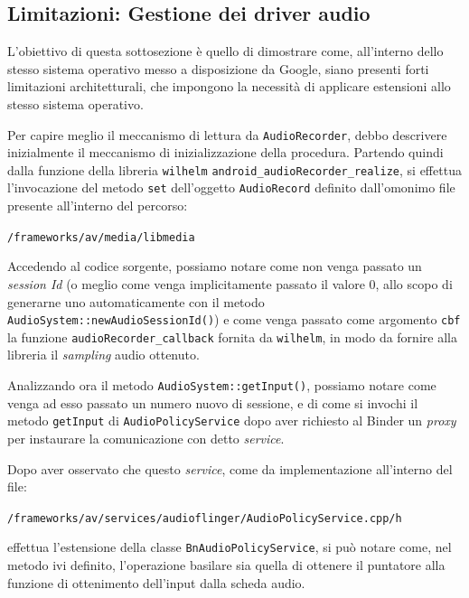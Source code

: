 \subsection{Limitazioni: Gestione dei driver audio}\label{subsec:mischeWilhelm}
L'obiettivo di questa sottosezione è quello di dimostrare come, all'interno dello
stesso sistema operativo messo a disposizione da Google, siano presenti 
forti limitazioni architetturali, che impongono la necessità di applicare
estensioni allo stesso sistema operativo. 
\bigskip

Per capire meglio il meccanismo di lettura da \texttt{\small AudioRecorder}, debbo descrivere
inizialmente il meccanismo di inizializzazione della procedura. Partendo quindi 
dalla funzione della libreria \texttt{\small wilhelm} \texttt{\small android\_audioRecorder\_realize},
 si effettua l'invocazione del metodo \texttt{\small set} dell'oggetto \texttt{\small AudioRecord}
definito dall'omonimo file presente all'interno del percorso:
\begin{center}
\texttt{\small \AOSP/frameworks/av/media/libmedia}
\end{center}
Accedendo al codice sorgente, possiamo notare come non venga passato un 
\textit{session Id} (o meglio come venga implicitamente passato il valore 0, allo scopo di generarne
uno automaticamente con il metodo \texttt{\small AudioSystem::newAudioSessionId()})
e come venga passato come argomento \texttt{\small cbf} la funzione 
\texttt{\small audioRecorder\_callback} fornita da \texttt{\small wilhelm}, in modo da fornire alla libreria il 
\textit{sampling} audio ottenuto.

Analizzando ora il metodo \texttt{\small AudioSystem::getInput()}, possiamo notare come
venga ad esso passato un numero nuovo di sessione, e di come si invochi il
metodo \texttt{\small getInput} di \texttt{\small AudioPolicyService} dopo aver
richiesto al Binder un \textit{proxy} per instaurare la comunicazione con detto \textit{service}.

Dopo aver osservato che questo \textit{service}, come da implementazione all'interno
del file:
\begin{center}
\texttt{\small \AOSP/frameworks/av/services/audioflinger/AudioPolicyService.cpp/h}
\end{center} 
effettua l'estensione della classe \texttt{\small BnAudioPolicyService}, si può notare
come, nel metodo ivi definito, l'operazione basilare sia quella di ottenere 
il puntatore alla funzione di ottenimento dell'input dalla scheda audio.

